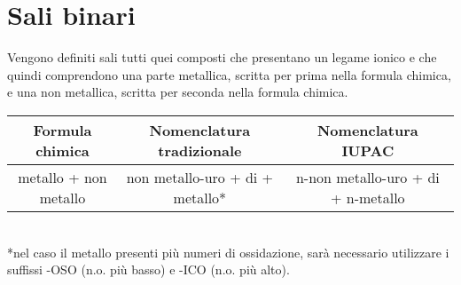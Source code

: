 \documentclass[10pt,a4paper]{article}
\begin{document}
\begin{center}
	
\end{center}

	\section*{Sali binari}
	
	Vengono definiti sali tutti quei composti che presentano un legame ionico e che quindi comprendono una parte metallica, scritta per prima nella formula chimica, e una non metallica, scritta per seconda nella formula chimica.\\
	
	\begin{tabular}{|c|c|c|}
		\hline
		Formula chimica & Nomenclatura tradizionale & Nomenclatura IUPAC \\
		\hline
		metallo + non metallo & non metallo-uro + di + metallo* & n-non metallo-uro + di + n-metallo \\
		\hline
	\end{tabular}\\

	*nel caso il metallo presenti più numeri di ossidazione, sarà necessario utilizzare i suffissi -OSO (n.o. più basso) e -ICO (n.o. più alto).
	
	
\end{document}

